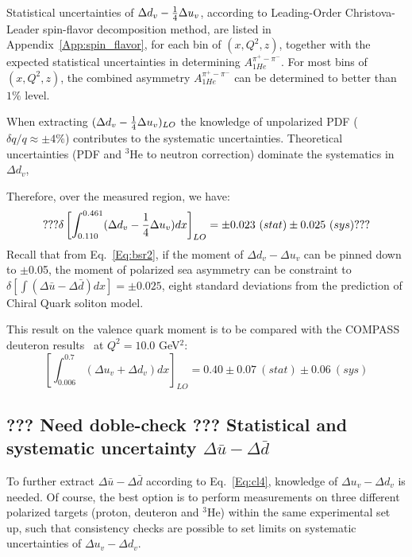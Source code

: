 Statistical uncertainties of $\Delta d_v-{1 \over 4} \Delta u_v$, according to Leading-Order Christova-Leader spin-flavor decomposition method, are listed in Appendix~\ref{App:spin_flavor}, for each bin of $(x, Q^2, z)$, together with the expected statistical uncertainties in determining  $A_{1He}^{\pi^+ - \pi^-}$. For most bins of $(x, Q^2, z)$, the combined asymmetry $A_{1He}^{\pi^+ - \pi^-}$ can be determined to better than $1\%$ level.


When extracting $( \Delta d_v -{1 \over 4} \Delta u_v )_{LO}$ 
the knowledge of unpolarized PDF ($\delta q/q \approx \pm 4\%$)  contributes 
to the systematic uncertainties. Theoretical uncertainties 
(PDF and $^3$He to neutron correction) dominate the systematics in $\Delta d_v$, %

Therefore, over the measured region, we have:
\begin{equation}
 ??? \delta \left[\int_{0.110}^{0.461}(\Delta d_v -{1 \over 4} \Delta u_v)dx \right]_{LO} = \pm 0.023 ~(stat) \pm 0.025~(sys) ???
\end{equation}
Recall that from Eq.~\ref{Eq:bsr2}, if the moment of $\Delta d_v- \Delta u_v$ can be pinned down to $\pm$0.05, 
the moment of polarized sea asymmetry can be constraint to $\delta \left[\int(\Delta \bar{u} - \Delta \bar{d})dx \right] = \pm 0.025$, eight
standard deviations from the prediction of Chiral Quark soliton model.
 
 This result on the valence quark moment is to be compared with the COMPASS deuteron results~\cite{compass2007} at $Q^2=10.0$ GeV$^2$:
\begin{equation}
  \left[\int_{0.006}^{0.7}(\Delta u_v + \Delta d_v)dx \right]_{LO} =  0.40 \pm 0.07 ~(stat) \pm 0.06~(sys) 
\end{equation}


\subsection{??? Need doble-check ??? Statistical and systematic uncertainty $\Delta \bar{u} -\Delta \bar{d}$}
To further extract $\Delta \bar{u}-\Delta \bar{d}$ according to Eq.~\ref{Eq:cl4}, 
knowledge of $\Delta u_v - \Delta d_v$ is needed.  
Of course, the best option is to perform measurements on three different polarized 
targets (proton, deuteron and $^3$He) within the same experimental set up, such that
consistency checks are possible to set limits on systematic uncertainties of $\Delta u_v - \Delta d_v$.

